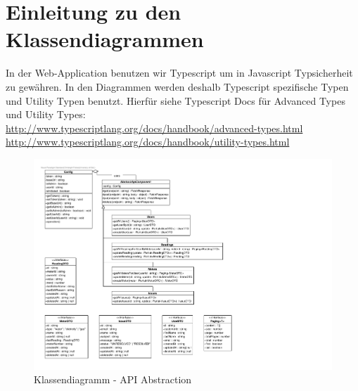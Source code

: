 
\section{Einleitung zu den Klassendiagrammen}
In der Web-Application benutzen wir Typescript um in Javascript Typsicherheit zu gewähren. In den Diagrammen werden deshalb Typescript spezifische Typen und Utility Typen benutzt. Hierfür siehe Typescript Docs für Advanced Types und Utility Types: \\
\url{http://www.typescriptlang.org/docs/handbook/advanced-types.html} \\
\url{http://www.typescriptlang.org/docs/handbook/utility-types.html}

\begin{figure}[H]
	\hspace{-3cm}
	\includegraphics[scale = 0.9]{./img/diagrams/api-classDiagram}
	\caption{Klassendiagramm - API Abstraction}
\end{figure}
\newpage

